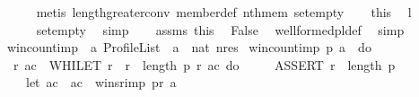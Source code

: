 \begin{isabellebody}
\ \ \ \ \isamarkupfalse%
\ {\isacharparenleft}{\kern0pt}metis\ length{\isacharunderscore}{\kern0pt}greater{\isacharunderscore}{\kern0pt}{}{\isacharunderscore}{\kern0pt}conv\ member{\isacharunderscore}{\kern0pt}def\ nth{\isacharunderscore}{\kern0pt}mem\ set{\isacharunderscore}{\kern0pt}empty{}{\isacharparenright}{\kern0pt}\isanewline
\ \ \isamarkupfalse%
\ this\ \isamarkupfalse%
\ {\isachardoublequoteopen}l\ {\isacharequal}{\kern0pt}\ {\isacharbrackleft}{\kern0pt}{\isacharbrackright}{\kern0pt}{\isachardoublequoteclose}\isanewline
\ \ \ \ \isamarkupfalse%
\ set{\isacharunderscore}{\kern0pt}empty\ \isamarkupfalse%
\ simp\isanewline
\ \ \isamarkupfalse%
\ assms\ this\ \isamarkupfalse%
\ {\isachardoublequoteopen}False{\isachardoublequoteclose}\ \isamarkupfalse%
\ well{\isacharunderscore}{\kern0pt}formed{\isacharunderscore}{\kern0pt}pl{\isacharunderscore}{\kern0pt}def\ \isamarkupfalse%
\ simp\isanewline
{}\isamarkupfalse%
%
\endisatagproof
{\isafoldproof}%
%
\isadelimproof
\isanewline
%
\endisadelimproof
\isanewline
\isanewline
{}\isamarkupfalse%
\ win{\isacharunderscore}{\kern0pt}count{\isacharunderscore}{\kern0pt}imp\ {\isacharcolon}{\kern0pt}{\isacharcolon}{\kern0pt}\ {\isachardoublequoteopen}{\isacharprime}{\kern0pt}a\ Profile{\isacharunderscore}{\kern0pt}List\ {\isasymRightarrow}\ {\isacharprime}{\kern0pt}a\ {\isasymRightarrow}\ nat\ nres{\isachardoublequoteclose}\ \isanewline
{\isachardoublequoteopen}win{\isacharunderscore}{\kern0pt}count{\isacharunderscore}{\kern0pt}imp\ p\ a\ {\isasymequiv}\ do\ {\isacharbraceleft}{\kern0pt}\isanewline
\ \ {\isacharparenleft}{\kern0pt}r{\isacharcomma}{\kern0pt}\ ac{\isacharparenright}{\kern0pt}\ {\isasymleftarrow}\ WHILET\ {\isacharparenleft}{\kern0pt}{\isasymlambda}{\isacharparenleft}{\kern0pt}r{\isacharcomma}{\kern0pt}\ {\isacharunderscore}{\kern0pt}{\isacharparenright}{\kern0pt}{\isachardot}{\kern0pt}\ r\ {\isacharless}{\kern0pt}\ length\ p{\isacharparenright}{\kern0pt}\ {\isacharparenleft}{\kern0pt}{\isasymlambda}{\isacharparenleft}{\kern0pt}r{\isacharcomma}{\kern0pt}\ ac{\isacharparenright}{\kern0pt}{\isachardot}{\kern0pt}\ do\ {\isacharbraceleft}{\kern0pt}\isanewline
\ \ \ \ ASSERT\ {\isacharparenleft}{\kern0pt}r\ {\isacharless}{\kern0pt}\ length\ p{\isacharparenright}{\kern0pt}{\isacharsemicolon}{\kern0pt}\isanewline
\ \ \ \ let\ ac\ {\isacharequal}{\kern0pt}\ ac\ {\isacharplus}{\kern0pt}\ {\isacharparenleft}{\kern0pt}winsr{\isacharunderscore}{\kern0pt}imp\ {\isacharparenleft}{\kern0pt}p{\isacharbang}{\kern0pt}r{\isacharparenright}{\kern0pt}\ a{\isacharparenright}{\kern0pt}{\isacharsemicolon}{\kern0pt}\isanewline

\end{isabellebody}
